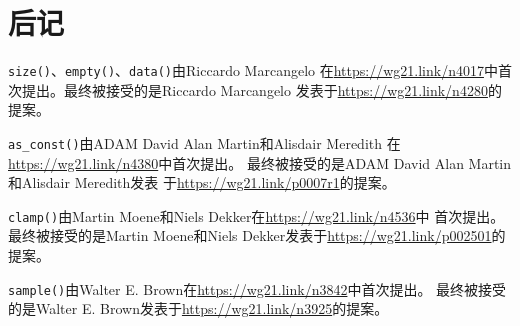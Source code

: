 \section{后记}
\texttt{size()}、\texttt{empty()}、\texttt{data()}由Riccardo Marcangelo
在\url{https://wg21.link/n4017}中首次提出。最终被接受的是Riccardo Marcangelo
发表于\url{https://wg21.link/n4280}的提案。

\texttt{as\_const()}由ADAM David Alan Martin和Alisdair Meredith
在\url{https://wg21.link/n4380}中首次提出。
最终被接受的是ADAM David Alan Martin和Alisdair Meredith发表
于\url{https://wg21.link/p0007r1}的提案。

\texttt{clamp()}由Martin Moene和Niels Dekker在\url{https://wg21.link/n4536}中
首次提出。最终被接受的是Martin Moene和Niels Dekker发表于\url{https://wg21.link/p002501}的提案。

\texttt{sample()}由Walter E. Brown在\url{https://wg21.link/n3842}中首次提出。
最终被接受的是Walter E. Brown发表于\url{https://wg21.link/n3925}的提案。